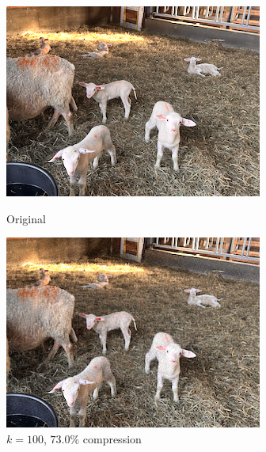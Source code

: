 \documentclass[12pt, letterpaper]{article}
\theoremstyle{definition}
\theoremstyle{remark}
\begin{document}
\begin{figure}[H]
  \centering
  \begin{minipage}[b]{0.4\textwidth}
    \includegraphics[width=\textwidth]{images/sheep.png}
    \caption{Original}
  \end{minipage}
  \hfill
  \begin{minipage}[b]{0.4\textwidth}
    \includegraphics[width=\textwidth]{images/compressed_sheep_100.png}
    \caption{$k = 100$, $73.0\%$ compression}
  \end{minipage}
\end{figure}
\end{document}
